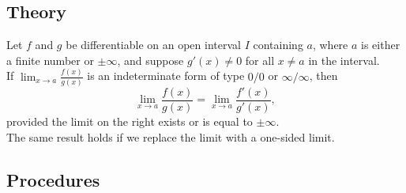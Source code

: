 \subsection*{Theory}
\begin{namedtheorem} Let $f$ and $g$ be differentiable on an open interval $I$ containing $a$, where $a$ is either a finite number or $\pm\infty$, and suppose $g'(x)\ne 0$ for all $x\ne a$ in the interval.
  \vspace{.1in}
  \\
  If $\displaystyle\lim_{x\to a}\frac{f(x)}{g(x)}$ is an indeterminate form of type $0/0$ or $\infty/\infty$, then
  \[
  \lim_{x\to a}\frac{f(x)}{g(x)}=\lim_{x\to a}\frac{f'(x)}{g'(x)},
  \]
  provided the limit on the right exists or is equal to $\pm\infty$. \\
  The same result holds if we replace the limit with a one-sided limit.

\end{namedtheorem}
\begin{comment}
Students tend to fall madly in love with l'H\^opital's rule after seeing it for the first time. Some comments to temper your passion:
\begin{enumerate}
  \item Make sure the necessary conditions hold: (a) $f,g$ differentiable on an interval about $a$, $g(x)\ne 0$ on for $x\ne a$, and the limit expression is indeterminate of type $0/0$ or $\infty/\infty$.
  \item As magic as the rule appears, there are many examples where either the application of this rule does not help, and/or it is easier to use a different technique. Consider the following limits, for example:
  \[
  \lim_{x\to\infty}\frac{e^x+e^{-x}}{e^x-e^{-x}}, \hspace{10pt} \lim_{x\rightarrow \infty}\frac{x^4-x^2+5x+7}{2x^4+x^3+x^2+x+1}
  \]
\end{enumerate}
\end{comment}


\subsection*{Procedures}


